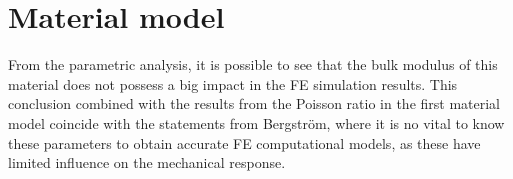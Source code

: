 %
%


\section{Material model}


From the parametric analysis, it is possible to see that the bulk 
modulus of this material does not possess a big impact in the FE 
simulation results. This conclusion combined with the results 
from the Poisson ratio in the first material model coincide with the 
statements from Bergström, where it is no vital to know these parameters 
to obtain accurate FE computational models, as these have limited
influence on the mechanical response. \cite{Bergström2015} %

